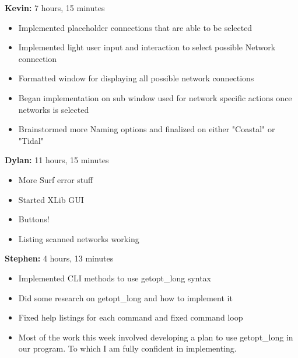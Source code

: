 \documentclass[11pt]{article}
\begin{document}
\textbf{Kevin:} 7 hours, 15 minutes
\begin{itemize}
  \item Implemented placeholder connections that are able to be selected
  \item Implemented light user input and interaction to select possible Network connection
  \item Formatted window for displaying all possible network connections
  \item Began implementation on sub window used for network specific actions once networks is selected
  \item Brainstormed more Naming options and finalized on either "Coastal" or "Tidal"
\end{itemize}

\textbf{Dylan:} 11 hours, 15 minutes
\begin{itemize}
  \item More Surf error stuff
  \item Started XLib GUI
  \item Buttons!
  \item Listing scanned networks working
\end{itemize}

\textbf{Stephen:} 4 hours, 13 minutes
\begin{itemize}
  \item Implemented CLI methods to use getopt\_long syntax
  \item Did some research on getopt\_long and how to implement it
  \item Fixed help listings for each command and fixed command loop 
  \item Most of the work this week involved developing a plan to use 
	getopt\_long in our program. To which I am fully confident in 
	implementing. 
\end{itemize}
\end{document}
